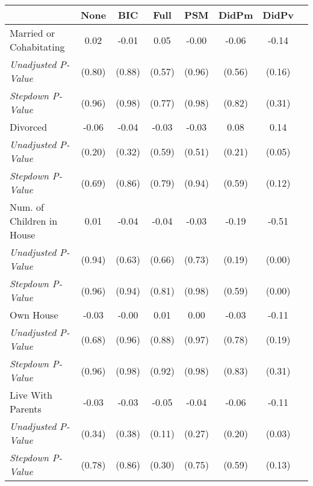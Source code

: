 \begin{tabular}{l c c c c c c c}
\toprule
 & None & BIC & Full & PSM & DidPm & DidPv \\
\midrule
Married or Cohabitating & 0.02 & -0.01 & 0.05 & -0.00 & -0.06 & -0.14 \\
\quad \textit{Unadjusted P-Value} & (0.80) & (0.88) & (0.57) & (0.96) & (0.56) & (0.16) \\
\quad \textit{Stepdown P-Value} & (0.96) & (0.98) & (0.77) & (0.98) & (0.82) & (0.31) \\
Divorced & -0.06 & -0.04 & -0.03 & -0.03 & 0.08 & 0.14 \\
\quad \textit{Unadjusted P-Value} & (0.20) & (0.32) & (0.59) & (0.51) & (0.21) & (0.05) \\
\quad \textit{Stepdown P-Value} & (0.69) & (0.86) & (0.79) & (0.94) & (0.59) & (0.12) \\
Num. of Children in House & 0.01 & -0.04 & -0.04 & -0.03 & -0.19 & -0.51 \\
\quad \textit{Unadjusted P-Value} & (0.94) & (0.63) & (0.66) & (0.73) & (0.19) & (0.00) \\
\quad \textit{Stepdown P-Value} & (0.96) & (0.94) & (0.81) & (0.98) & (0.59) & (0.00) \\
Own House & -0.03 & -0.00 & 0.01 & 0.00 & -0.03 & -0.11 \\
\quad \textit{Unadjusted P-Value} & (0.68) & (0.96) & (0.88) & (0.97) & (0.78) & (0.19) \\
\quad \textit{Stepdown P-Value} & (0.96) & (0.98) & (0.92) & (0.98) & (0.83) & (0.31) \\
Live With Parents & -0.03 & -0.03 & -0.05 & -0.04 & -0.06 & -0.11 \\
\quad \textit{Unadjusted P-Value} & (0.34) & (0.38) & (0.11) & (0.27) & (0.20) & (0.03) \\
\quad \textit{Stepdown P-Value} & (0.78) & (0.86) & (0.30) & (0.75) & (0.59) & (0.13) \\
\bottomrule
\end{tabular}

